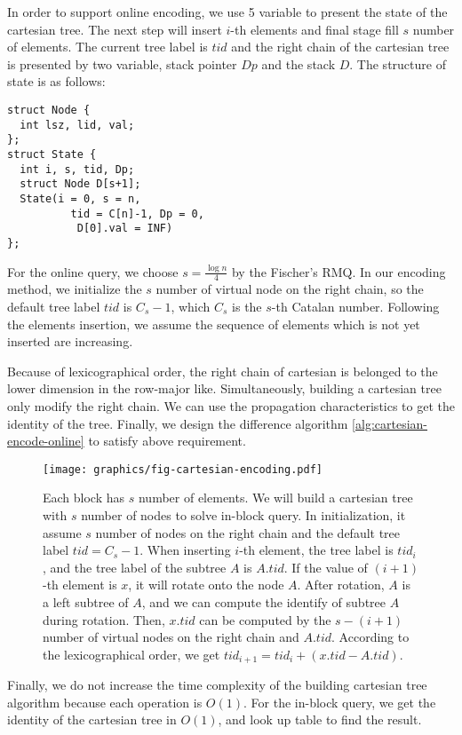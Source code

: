 

In order to support online encoding, we use 5 variable to present the
state of the cartesian tree.  The next step will insert $i$-th
elements and final stage fill $s$ number of elements.  The current
tree label is $\mathit{tid}$ and the right chain of the cartesian tree
is presented by two variable, stack pointer $\mathit{Dp}$ and the
stack $\mathit{D}$. The structure of state is as follows:

\begin{minipage}{0.9\linewidth}
\begin{lstlisting}[frame=single,caption=State of Cartesian Tree]
struct Node {
  int lsz, lid, val;
};
struct State {
  int i, s, tid, Dp;
  struct Node D[s+1];
  State(i = 0, s = n, 
          tid = C[n]-1, Dp = 0,
           D[0].val = INF)
};
\end{lstlisting}
\end{minipage}

For the online query, we choose $s=\frac{\log n}{4}$ by the Fischer's
RMQ.  In our encoding method, we initialize the $s$ number of virtual
node on the right chain, so the default tree label $\mathit{tid}$ is
$C_s - 1$, which $C_s$ is the $s$-th Catalan number.  Following the
elements insertion, we assume the sequence of elements which is not
yet inserted are increasing.

Because of lexicographical order, the right chain of cartesian is
belonged to the lower dimension in the row-major like.
Simultaneously, building a cartesian tree only modify the right chain.
We can use the propagation characteristics to get the identity of the
tree.  Finally, we design the difference algorithm \ref{alg:cartesian-
encode-online} to satisfy above requirement.



\begin{figure*}[!thb]
  \centering
  \texttt{[image: graphics/fig-cartesian-encoding.pdf]}

  \caption{  
Each block has $s$ number of elements.  We will build a
cartesian tree with $s$ number of nodes to solve in-block query.  In
initialization, it assume $s$ number of nodes on the right chain and
the default tree label $\mathit{tid} = C_s - 1$.  When inserting
$i$-th element, the tree label is $\mathit{tid}_i$, and the tree label
of the subtree $A$ is $A.\mathit{tid}$.  If the value of $(i+1)$-th
element is $x$, it will rotate onto the node $A$.  After rotation, $A$
is a left subtree of $A$, and we can compute the identify of subtree
$A$ during rotation.  Then, $x.\mathit{tid}$ can be computed by the
$s-(i+1)$ number of virtual nodes on the right chain and
$A.\mathit{tid}$.  According to the lexicographical order, we get
$\mathit{tid}_{i+1} = \mathit{tid}_i + (x.\mathit{tid} -
A.\mathit{tid})$. 
}

  \label{fig:cartesianEncoding}
\end{figure*}

Finally, we do not increase the time complexity of the building
cartesian tree algorithm because each operation is $O(1)$.  For the
in-block query, we get the identity of the cartesian tree in $O(1)$,
and look up table to find the result.




